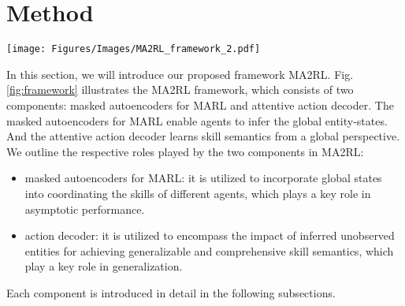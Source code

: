 \section{Method}
\label{sec:framework}
\begin{figure*}[t]
    \centering
    \texttt{[image: Figures/Images/MA2RL\_framework\_2.pdf]}
    \caption{The network structure of MA2RL. (a) The overall architecture. (b) The stucture of variational autoencoder (VAE). (c) The details of masked autoencoder for MARL, where entity-observations can be regarded as a mask of the entity-states. (d) The attentive Action decoder that reuses the decoder in VAE to infer masked entity-observations for better action execution.
}
\label{fig:framework}
\end{figure*}

In this section, we will introduce our proposed framework MA2RL. Fig.\ref{fig:framework} illustrates the MA2RL framework, which consists of two components: masked autoencoders for MARL and attentive action decoder. The masked autoencoders for MARL enable agents to infer the global entity-states. And the attentive action decoder learns skill semantics from a global perspective. We outline the respective roles played by the two components in MA2RL:
\begin{itemize}
    \item masked autoencoders for MARL: it is utilized to incorporate global states into coordinating the skills of different agents, which plays a key role in asymptotic performance.
    \item action decoder: it is utilized to encompass the impact of inferred unobserved entities for achieving generalizable and comprehensive skill semantics, which play a key role in generalization.
\end{itemize}

Each component is introduced in detail in the following subsections.

